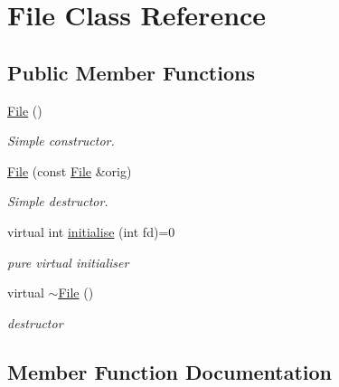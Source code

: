\hypertarget{class_file}{}\section{File Class Reference}
\label{class_file}
\subsection*{Public Member Functions}
\begin{DoxyCompactItemize}
\item 
\hypertarget{class_file_ae039af5807fc385f41b60644725d15d0}{}\hyperlink{class_file_ae039af5807fc385f41b60644725d15d0}{File} ()\label{class_file_ae039af5807fc385f41b60644725d15d0}

\begin{DoxyCompactList}\small\item\em Simple constructor. \end{DoxyCompactList}\item 
\hypertarget{class_file_a1e667576d9822d58b19a71542755c95d}{}\hyperlink{class_file_a1e667576d9822d58b19a71542755c95d}{File} (const \hyperlink{class_file}{File} \&orig)\label{class_file_a1e667576d9822d58b19a71542755c95d}

\begin{DoxyCompactList}\small\item\em Simple destructor. \end{DoxyCompactList}\item 
virtual int \hyperlink{class_file_ac0d287d91b41266d92f4a5d9029af4c7}{initialise} (int fd)=0
\begin{DoxyCompactList}\small\item\em pure virtual initialiser \end{DoxyCompactList}\item 
\hypertarget{class_file_ac704ebdf5f57d7a1c5ddf409d797fb69}{}virtual \hyperlink{class_file_ac704ebdf5f57d7a1c5ddf409d797fb69}{$\sim$\+File} ()\label{class_file_ac704ebdf5f57d7a1c5ddf409d797fb69}

\begin{DoxyCompactList}\small\item\em destructor \end{DoxyCompactList}\end{DoxyCompactItemize}


\subsection{Member Function Documentation}
\hypertarget{class_file_ac0d287d91b41266d92f4a5d9029af4c7}{}
